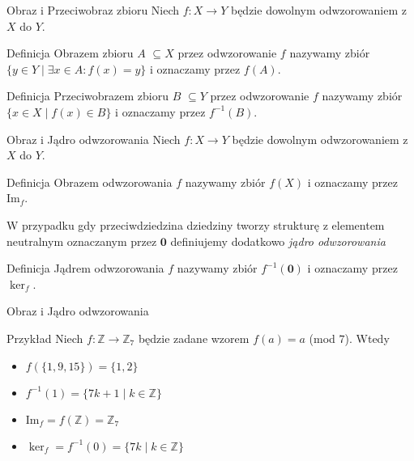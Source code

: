 \documentclass{beamer}
\newcommand{\zero}{\mathbf{0}}
\newcommand{\image}{\textrm{Im}}
\begin{document}
\begin{frame}{Obraz i Przeciwobraz zbioru}
    Niech $f : X \rightarrow Y$ będzie dowolnym odwzorowaniem z $X$ do $Y$. 
    \begin{block}{Definicja}
        \alert{Obrazem zbioru $A$} $ \subseteq X$ przez odwzorowanie $f$ nazywamy zbiór 
        $\{y \in Y \mid \exists x \in A : f(x) = y\}$ i oznaczamy przez $f(A)$.
    \end{block}
    \begin{block}{Definicja}
        \alert{Przeciwobrazem zbioru $B$ } $ \subseteq Y$ przez odwzorowanie $f$ nazywamy zbiór 
        $\{ x \in X  \mid  f(x) \in B \}$ i oznaczamy przez $f^{-1}(B)$.
    \end{block}
\end{frame}

\begin{frame}{Obraz i Jądro odwzorowania }
    Niech $f : X \rightarrow Y$ będzie dowolnym odwzorowaniem z $X$ do $Y$. 
    \begin{block}{Definicja}
        \alert{Obrazem odwzorowania $f$} nazywamy zbiór $f(X)$ i oznaczamy przez $\image_f$.
    \end{block}
    W przypadku gdy przeciwdziedzina dziedziny tworzy strukturę z elementem neutralnym oznaczanym przez $\zero$
    definiujemy dodatkowo \textit{jądro odwzorowania}
    \begin{block}{Definicja}
        \alert{Jądrem odwzorowania $f$} nazywamy zbiór $f^{-1}(\zero)$ i oznaczamy przez $\ker_f$.
    \end{block}
\end{frame}

\begin{frame}{Obraz i Jądro odwzorowania}
    \begin{exampleblock}{Przykład}
        Niech $f : \mathbb{Z} \rightarrow \mathbb{Z}_7$ będzie zadane wzorem $f(a) = a $ (mod $7$).
        Wtedy
        \begin{itemize}
            \item $f(\{1,9,15\}) = \{1,2\}$
            \item $f^{-1}(1) = \{ 7k + 1 \mid k \in \mathbb{Z}\}$
            \item $\image_f = f(\mathbb{Z}) = \mathbb{Z}_7$
            \item $\ker_f =f^{-1}(0) = \{ 7k \mid k \in \mathbb{Z} \}$ 
        \end{itemize}
    \end{exampleblock}
\end{frame}
\end{document}
